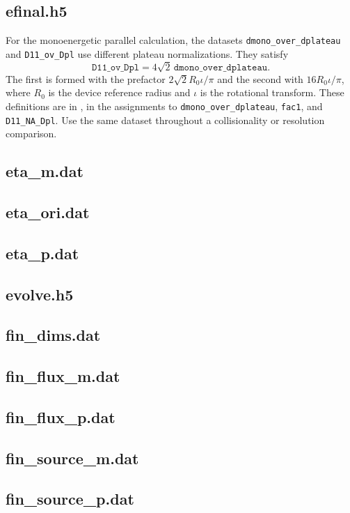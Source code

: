 \subsection{efinal.h5}
For the monoenergetic parallel calculation, the datasets
\texttt{dmono\_over\_dplateau} and \texttt{D11\_ov\_Dpl} use different
plateau normalizations. They satisfy
\[
  \texttt{D11\_ov\_Dpl}
  = 4\sqrt{2}\,\texttt{dmono\_over\_dplateau}.
\]
The first is formed with the prefactor $2\sqrt{2}R_0\iota/\pi$ and the
second with $16R_0\iota/\pi$, where $R_0$ is the device reference radius
and $\iota$ is the rotational transform. These definitions are in
, in the assignments to
\texttt{dmono\_over\_dplateau}, \texttt{fac1}, and \texttt{D11\_NA\_Dpl}.
Use the same dataset throughout a collisionality or resolution comparison.

\subsection{eta\_m.dat}
\subsection{eta\_ori.dat}
\subsection{eta\_p.dat}

\subsection{evolve.h5}

\subsection{fin\_dims.dat}
\subsection{fin\_flux\_m.dat}
\subsection{fin\_flux\_p.dat}

\subsection{fin\_source\_m.dat}
\subsection{fin\_source\_p.dat}

